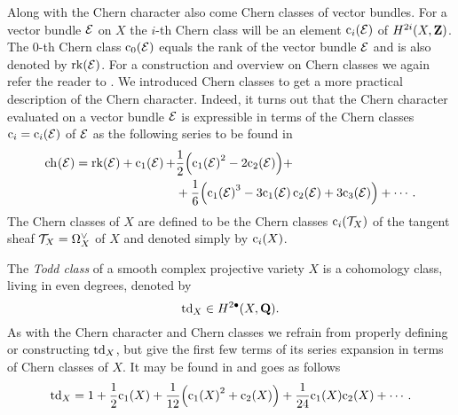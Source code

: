 Along with the Chern character also come Chern classes of vector bundles. For a vector bundle $\mathcal E$ on $X$ the $i$-th Chern class will be an element $\cclass[i](\E)$ of $H^{2i}(X, \mathbf Z)$. The $0$-th Chern class $\cclass[0](\E)$ equals the rank of the vector bundle $\mathcal E$ and is also denoted by $\operatorname{rk}(\mathcal E)$. For a construction and overview on Chern classes we again refer the reader to \cite[\S 3.2]{Fulton1998}.
We introduced Chern classes to get a more practical description of the Chern character. Indeed, it turns out that the Chern character evaluated on a vector bundle $\mathcal E$ is expressible in terms of the Chern classes $\cclass[i] = \cclass[i](\E)$ of $\mathcal E$ as the following series to be found in \cite[\S 3, Example 3.2.3]{Fulton1998}
\begin{align}
    \label{eq: chern character series expansion}
    \ch[]{\E} = \rk{\E} + \cclass[1]{\E} + &\frac{1}{2}\Bigl(\cclass[1]{\E}^2 - 2\cclass[2]{\E}\Bigr) + \notag
    \\ &+ \frac{1}{6}\Bigl(\cclass[1]{\E}^3 - 3 \cclass[1]{\E}\cclass[2]{\E} + 3\cclass[3]{\E}\Bigr) + \cdots.
\end{align}
The Chern classes of $X$ are defined to be the Chern classes $\cclass[i](\tangent{X})$ of the tangent sheaf $\mathcal{T}_{X} = \Omega_X^\vee$ of $X$ and denoted simply by $\cclass[i](X)$.



The \emph{Todd class} of a smooth complex projective variety $X$ is a cohomology class, living in even degrees, denoted by
\[
    \operatorname{td}_{X} \in H^{2\bullet}(X, \mathbf Q).
\]
As with the Chern character and Chern classes we refrain from properly defining or constructing $\operatorname{td}_{X}$, but give the first few terms of its series expansion in terms of Chern classes of 
$X$. It may be found in \cite[\S 3, Example 3.2.4]{Fulton1998} and goes as follows
\begin{equation}
    \label{eq: todd class}
    \tdclass{X} = 1 + \frac{1}{2}\cclass[1](X) + \frac{1}{12}\Bigl(\cclass[1]{X}^2 + \cclass[2]{X}\Bigr) + \frac{1}{24}\cclass[1](X)\cclass[2](X) + \cdots.
\end{equation} 




